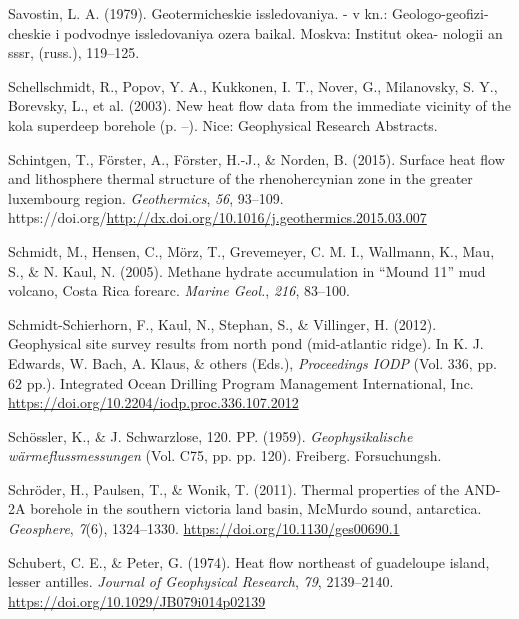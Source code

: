 \documentclass[draft,linenumbers]{agujournal2018}
\begin{document}
\leavevmode{}%
Savostin, L. A. (1979). Geotermicheskie issledovaniya. - v kn.:
Geologo-geofizi- cheskie i podvodnye issledovaniya ozera baikal. Moskva:
Institut okea- nologii an sssr, (russ.), 119--125.

\leavevmode{}%
Schellschmidt, R., Popov, Y. A., Kukkonen, I. T., Nover, G., Milanovsky,
S. Y., Borevsky, L., et al. (2003). New heat flow data from the
immediate vicinity of the kola superdeep borehole (p. --). Nice:
Geophysical Research Abstracts.

\leavevmode{}%
Schintgen, T., Förster, A., Förster, H.-J., \& Norden, B. (2015).
Surface heat flow and lithosphere thermal structure of the
rhenohercynian zone in the greater luxembourg region.
\emph{Geothermics}, \emph{56}, 93--109.
https://doi.org/\url{http://dx.doi.org/10.1016/j.geothermics.2015.03.007}

\leavevmode{}%
Schmidt, M., Hensen, C., Mörz, T., Grevemeyer, C. M. I., Wallmann, K.,
Mau, S., \& N. Kaul, N. (2005). Methane hydrate accumulation in
{{``Mound 11''}} mud volcano, {Costa Rica forearc}. \emph{Marine Geol.},
\emph{216}, 83--100.

\leavevmode{}%
Schmidt-Schierhorn, F., Kaul, N., Stephan, S., \& Villinger, H. (2012).
Geophysical site survey results from north pond (mid-atlantic ridge). In
K. J. Edwards, W. Bach, A. Klaus, \& others (Eds.), \emph{Proceedings
IODP} (Vol. 336, pp. 62 pp.). Integrated Ocean Drilling Program
Management International, Inc.
\url{https://doi.org/10.2204/iodp.proc.336.107.2012}

\leavevmode{}%
Schössler, K., \& J. Schwarzlose, 120. PP. (1959).
\emph{Geophysikalische w{ä}rmeflussmessungen} (Vol. C75, pp. pp. 120).
Freiberg. Forsuchungsh.

\leavevmode{}%
Schröder, H., Paulsen, T., \& Wonik, T. (2011). Thermal properties of
the AND-2A borehole in the southern victoria land basin, McMurdo sound,
antarctica. \emph{Geosphere}, \emph{7}(6), 1324--1330.
\url{https://doi.org/10.1130/ges00690.1}

\leavevmode{}%
Schubert, C. E., \& Peter, G. (1974). Heat flow northeast of guadeloupe
island, lesser antilles. \emph{Journal of Geophysical Research},
\emph{79}, 2139--2140. \url{https://doi.org/10.1029/JB079i014p02139}
\end{document}
